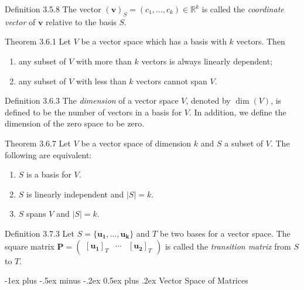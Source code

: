\documentclass[10pt,landscape]{article}
\makeatletter
\renewcommand{\section}{\@startsection{section}{1}{0mm}%
                                {-1ex plus -.5ex minus -.2ex}%
                                {0.5ex plus .2ex}%
                                {\normalfont\large\bfseries}}
\newcommand{\matr}[1]{\bm{#1}}
\newcommand{\vect}[1]{\bm{#1}}
\theoremstyle{definition}
\newcommand{\thistheoremname}{}
\newtheorem*{genericthm*}{\thistheoremname}
\newenvironment{namedthm*}[1]
{\renewcommand{\thistheoremname}{#1}\begin{genericthm*}}
{\end{genericthm*}}
\makeatother
\begin{document}
\begin{multicols}{3}
\begin{namedthm*}{Definition 3.5.8}
    \medskip
    \noindent
    The vector \((\vect{v})_S = (c_1, \dots, c_k) \in \mathbb{R}^k\) is called the \textit{coordinate vector} of \(\vect{v}\) relative to the basis \(S\).
\end{namedthm*}

\begin{namedthm*}{Theorem 3.6.1}
    Let \(V\) be a vector space which has a basis with \(k\) vectors. Then
    \begin{enumerate}
        \item any subset of \(V\) with more than \(k\) vectors is always linearly dependent;
        \item any subset of \(V\) with less than \(k\) vectors cannot span \(V\).
    \end{enumerate}
\end{namedthm*}

\begin{namedthm*}{Definition 3.6.3}
    The \textit{dimension} of a vector space \(V\), denoted by \(\dim(V)\), is defined to be the number of vectors in a basis for \(V\). In addition, we define the dimension of the zero space to be zero.
\end{namedthm*}

\begin{namedthm*}{Theorem 3.6.7}
    Let \(V\) be a vector space of dimension \(k\) and \(S\) a subset of \(V\). The following are equivalent:
    \begin{enumerate}
        \item \(S\) is a basis for \(V\).
        \item \(S\) is linearly independent and \(|S| = k\).
        \item \(S\) spans \(V\) and \(|S| = k\).
    \end{enumerate}
\end{namedthm*}

\begin{namedthm*}{Definition 3.7.3}
    Let \(S = \{\vect{u_1}, \dots, \vect{u_k}\}\) and \(T\) be two bases for a vector space. The square matrix \(\matr{P} = \begin{pmatrix}\left[\vect{u_1}\right]_T & \cdots & \left[\vect{u_2}\right]_T\end{pmatrix} \) is called the \textit{transition matrix} from \(S\) to \(T\).
\end{namedthm*}

\section{Vector Space of Matrices}


\end{multicols}
\end{document}
